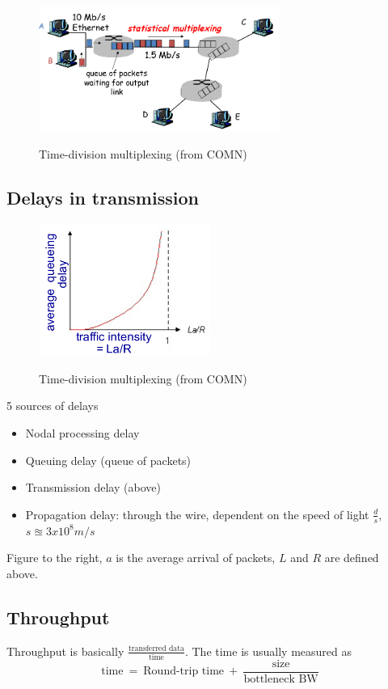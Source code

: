 \documentclass{article}
\begin{document}
\begin{figure}
    \centering
    \includegraphics[width=0.7\textwidth]{figures/tdm.png}
    \label{fig:tdm}
    \caption{Time-division multiplexing (from COMN)}
\end{figure}


\subsection{Delays in transmission}
\begin{figure}
    \centering
    \includegraphics[width=0.5\textwidth]{figures/delay.png}
    \label{fig:tdm}
    \caption{Time-division multiplexing (from COMN)}
\end{figure}


5 sources of delays
\begin{itemize}
    \item Nodal processing delay
    \item Queuing delay (queue of packets)
    \item Transmission delay (above)
    \item Propagation delay: through the wire, dependent on the speed of light $\frac{d}{s}$, $s\approxeq 3x10^8 m/s$
\end{itemize}

Figure to the right, $a$ is the average arrival of packets, $L$ and $R$ are defined above.

\subsection{Throughput}
Throughput is basically $\frac{\text{transferred data}}{\text{time}}$. The time is usually measured as 
\begin{equation}
    \text{time}\ =\ \text{Round-trip time}\ + \ \frac{\text{size}}{\text{bottleneck BW}}
\end{equation}
\end{document}
